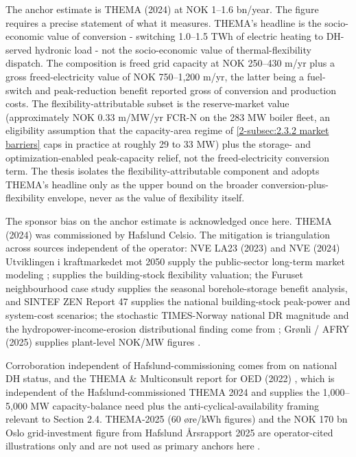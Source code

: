 The anchor estimate is THEMA (2024) at NOK 1–1.6 bn/year. The figure requires a precise statement of what it measures. THEMA's headline is the socio-economic value of conversion - switching 1.0–1.5 TWh of electric heating to DH-served hydronic load - not the socio-economic value of thermal-flexibility dispatch. The composition is freed grid capacity at NOK 250–430 m/yr plus a gross freed-electricity value of NOK 750–1,200 m/yr, the latter being a fuel-switch and peak-reduction benefit reported gross of conversion and production costs. The flexibility-attributable subset is the reserve-market value (approximately NOK 0.33 m/MW/yr FCR-N on the 283 MW boiler fleet, an eligibility assumption that the capacity-area regime of \autoref{2-subsec:2.3.2 market barriers} caps in practice at roughly 29 to 33 MW) plus the storage- and optimization-enabled peak-capacity relief, not the freed-electricity conversion term. The thesis isolates the flexibility-attributable component and adopts THEMA's headline only as the upper bound on the broader conversion-plus-flexibility envelope, never as the value of flexibility itself.

The sponsor bias on the anchor estimate is acknowledged once here. THEMA (2024) was commissioned by Hafslund Celsio. The mitigation is triangulation across sources independent of the operator: NVE LA23 (2023) and NVE (2024) Utviklingen i kraftmarkedet mot 2050 supply the public-sector long-term market modeling \cite{nve_utviklingen_2024}; \cite{rosnes_energifleksible_2023} supplies the building-stock flexibility valuation; the Furuset neighbourhood case study \cite{kauko_assessing_2022} supplies the seasonal borehole-storage benefit analysis, and SINTEF ZEN Report 47 \cite{SINTEF_energy_2023} supplies the national building-stock peak-power and system-cost scenarios; the stochastic TIMES-Norway national DR magnitude and the hydropower-income-erosion distributional finding come from \cite{ahang_analysis_2025}; Grønli / AFRY (2025) supplies plant-level NOK/MW figures 
. 

Corroboration independent of Hafslund-commissioning comes from \cite{energikommisjonen_mer_2023} on national DH status, and the THEMA \& Multiconsult report for OED (2022) \cite{thema_consulting_group_har_2022}, which is independent of the Hafslund-commissioned THEMA 2024 and supplies the 1,000–5,000 MW capacity-balance need plus the anti-cyclical-availability framing relevant to Section 2.4. THEMA-2025 (60 øre/kWh figures) and the NOK 170 bn Oslo grid-investment figure from Hafslund Årsrapport 2025 are operator-cited illustrations only and are not used as primary anchors here 
.

